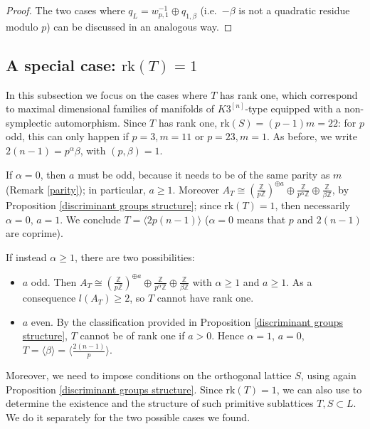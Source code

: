 \documentclass{amsart}
\theoremstyle{definition}
\newcommand{\IZ}{\mathbb{Z}}
\newcommand{\rk}{\mathrm{rk}}
\newcommand{\hskn}{K3^{\left[n\right]}}
\begin{document}
\begin{proof}
The two cases where $q_L = w^{-1}_{p,1} \oplus q_{1, \beta}$ (i.e.\ $-\beta$ is not a quadratic residue modulo $p$) can be discussed in an analogous way.
\end{proof}

\subsection{A special case: $\rk(T)=1$}\label{subsection: rkT=1}
In this subsection we focus on the cases where $T$ has rank one, which correspond to maximal dimensional families of manifolds of $\hskn$-type equipped with a non-symplectic automorphism. Since $T$ has rank one, $\rk(S) = (p-1)m = 22$: for $p$ odd, this can only happen if $p = 3, m = 11$ or $p = 23, m = 1$. As before, we write $2(n-1) = p^\alpha \beta$, with $(p, \beta) = 1$.

If $\alpha = 0$, then $a$ must be odd, because it needs to be of the same parity as $m$ (Remark \ref{parity}); in particular, $a \geq 1$. Moreover $A_T \cong \left(\frac{\IZ}{p \IZ}\right)^{\oplus a} \oplus \frac{\IZ}{p^\alpha \IZ} \oplus \frac{\IZ}{\beta \IZ}$, by Proposition \ref{discriminant groups structure}; since $\rk(T)=1$, then necessarily $\alpha = 0$, $a = 1$. We conclude $T = \langle 2p(n-1) \rangle$ ($\alpha=0$ means that $p$ and $2(n-1)$ are coprime).

If instead $\alpha \geq 1$, there are two possibilities:
\begin{itemize}
\item $a$ odd. Then $A_T \cong \left(\frac{\IZ}{p \IZ}\right)^{\oplus a} \oplus \frac{\IZ}{p^\alpha \IZ} \oplus \frac{\IZ}{\beta \IZ}$ with $\alpha \geq 1$ and $a \geq 1$. As a consequence $l(A_T) \geq 2$, so $T$ cannot have rank one.
\item $a$ even. By the classification provided in Proposition \ref{discriminant groups structure}, $T$ cannot be of rank one if $a > 0$. Hence $\alpha = 1$, $a=0$, $T = \langle \beta \rangle = \langle \frac{2(n-1)}{p} \rangle$.
\end{itemize}

Moreover, we need to impose conditions on the orthogonal lattice $S$, using again Proposition \ref{discriminant groups structure}. Since $\rk(T) = 1$, we can also use \cite[Proposition 3.6]{ghs} to determine the existence and the structure of such primitive sublattices $T, S \subset L$. We do it separately for the two possible cases we found.
\end{document}
